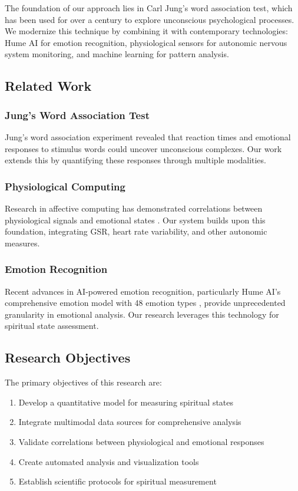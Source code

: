 \documentclass[12pt,a4paper]{article}
\begin{document}
The foundation of our approach lies in Carl Jung's word association test, which has been used for over a century to explore unconscious psychological processes. We modernize this technique by combining it with contemporary technologies: Hume AI for emotion recognition, physiological sensors for autonomic nervous system monitoring, and machine learning for pattern analysis.

\subsection{Related Work}

\subsubsection{Jung's Word Association Test}
Jung's word association experiment \citep{jung1906studien} revealed that reaction times and emotional responses to stimulus words could uncover unconscious complexes. Our work extends this by quantifying these responses through multiple modalities.

\subsubsection{Physiological Computing}
Research in affective computing has demonstrated correlations between physiological signals and emotional states \citep{picard2000affective}. Our system builds upon this foundation, integrating GSR, heart rate variability, and other autonomic measures.

\subsubsection{Emotion Recognition}
Recent advances in AI-powered emotion recognition, particularly Hume AI's comprehensive emotion model with 48 emotion types \citep{hume2023emotion}, provide unprecedented granularity in emotional analysis. Our research leverages this technology for spiritual state assessment.

\subsection{Research Objectives}

The primary objectives of this research are:

\begin{enumerate}
    \item Develop a quantitative model for measuring spiritual states
    \item Integrate multimodal data sources for comprehensive analysis
    \item Validate correlations between physiological and emotional responses
    \item Create automated analysis and visualization tools
    \item Establish scientific protocols for spiritual measurement
\end{enumerate}
\end{document}
